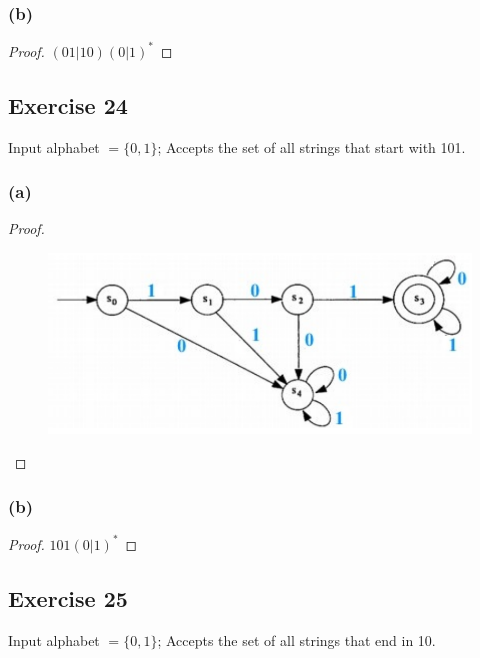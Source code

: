 \documentclass[14pt]{extarticle}
\begin{document}
\subsubsection{(b)}
\begin{proof}
    \((01|10)(0|1)^*\)
\end{proof}

\subsection{Exercise 24}
Input alphabet \(= \{0, 1\}\); Accepts the set of all strings that start with 101.

\subsubsection{(a)}

\begin{proof}
    \begin{figure}[ht!]
        \centering
        \includegraphics[scale=0.4]{../images/12.2.24.a.png}
    \end{figure}
\end{proof}

\subsubsection{(b)}

\begin{proof}
    \(101(0|1)^*\)
\end{proof}

\subsection{Exercise 25}
Input alphabet \(= \{0, 1\}\); Accepts the set of all strings that end in 10.
\end{document}
